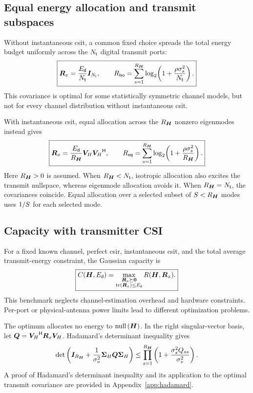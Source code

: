 \subsection{Equal energy allocation and transmit subspaces}

Without instantaneous \ac{csit}, a common fixed choice spreads the total energy budget uniformly across the $N_{\mathsf{t}}$ digital transmit ports:
\begin{equation}\label{eq:isotropic}
	\boxed{
		\bm{R}_x=\frac{E_{\mathsf{d}}}{N_{\mathsf{t}}}\bm{I}_{N_{\mathsf{t}}},\qquad
		R_{\mathsf{iso}}=\sum_{s=1}^{R_{\bm{H}}}
		\log_2\!\left(1+\frac{\rho\sigma_s^2}{N_{\mathsf{t}}}\right).}
\end{equation}
This covariance is optimal for some statistically symmetric channel models, but not for every channel distribution without instantaneous \ac{csit}.

With instantaneous \ac{csit}, equal allocation across the $R_{\bm{H}}$ nonzero eigenmodes instead gives
\begin{equation}\label{eq:equalmodes}
	\boxed{
		\bm{R}_x=\frac{E_{\mathsf{d}}}{R_{\bm{H}}}\bm{V}_{H}{\bm{V}_{H}}^{\mathsf{H}},\qquad
		R_{\mathsf{eq}}=\sum_{s=1}^{R_{\bm{H}}}
		\log_2\!\left(1+\frac{\rho\sigma_s^2}{R_{\bm{H}}}\right).}
\end{equation}
Here $R_{\bm{H}}>0$ is assumed. When $R_{\bm{H}}<N_{\mathsf{t}}$, isotropic allocation also excites the transmit nullspace, whereas eigenmode allocation avoids it. When $R_{\bm{H}}=N_{\mathsf{t}}$, the covariances coincide. Equal allocation over a selected subset of $S<R_{\bm{H}}$ modes uses $1/S$ for each selected mode.

\subsection{Capacity with transmitter CSI}

For a fixed known channel, perfect \ac{csir}, instantaneous \ac{csit}, and the total average transmit-energy constraint, the Gaussian capacity is
\begin{equation}\label{eq:capacity}
	\boxed{
		C(\bm{H},E_{\mathsf{d}})=
		\max_{\substack{\bm{R}_x\succeq\bm{0}\\\operatorname{tr}\left(\bm{R}_x\right)\leq E_{\mathsf{d}}}}
		R(\bm{H},\bm{R}_x).}
\end{equation}
This benchmark neglects channel-estimation overhead and hardware constraints. Per-port or physical-antenna power limits lead to different optimization problems.

The optimum allocates no energy to $\operatorname{null}\left(\bm{H}\right)$. In the right singular-vector basis, let
$\bm{Q}={\bm{V}_{H}}^{\mathsf{H}}\bm{R}_x\bm{V}_{H}$. Hadamard's determinant inequality gives
\[
\operatorname{det}\left(\bm{I}_{R_{\bm{H}}}+
	\frac{1}{\sigma_v^2}\bm{\Sigma}_{H}\bm{Q}\bm{\Sigma}_{H}\right)
\leq\prod_{s=1}^{R_{\bm{H}}}
\left(1+\frac{\sigma_s^2 Q_{ss}}{\sigma_v^2}\right).
\]
A proof of Hadamard's determinant inequality
and its application to the optimal transmit
covariance are provided in
Appendix~\ref{app:hadamard}.

